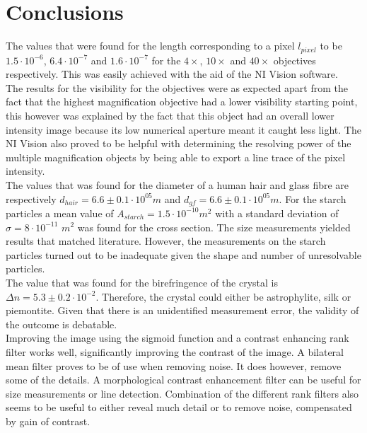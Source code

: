 \section{Conclusions}

The values that were found  for the length corresponding to a pixel $l_{pixel}$ to be $1.5\cdot10^{-6}$, $6.4\cdot10^{-7}$ and $1.6\cdot10^{-7}$ for the $4\times$, $10\times$ and $40\times$ objectives respectively. This was easily achieved with the aid of the NI Vision software.\\
The results for the visibility for the objectives were as expected apart from the fact that the highest magnification objective had a lower visibility starting point, this however was explained by the fact that this object had an overall lower intensity image because its low numerical aperture meant it caught less light. The NI Vision also proved to be helpful with determining the resolving power of the multiple magnification objects by being able to export a line trace of the pixel intensity.\\
The values that was found for the diameter of a human hair and glass fibre are respectively $d_{hair}=6.6\pm0.1\cdot10^{05} m$ and $d_{gf}=6.6\pm0.1\cdot10^{05} m$. For the starch particles a mean  value of $A_{starch}=1.5\cdot10^{-10} m^2$ with a standard deviation of $\sigma = 8 \cdot10^{-11}$ $m^2$ was found for the cross section. The size measurements yielded results that matched literature. However, the measurements on the starch particles turned out to be inadequate given the shape and number of unresolvable particles.\\
The value that was found for the birefringence of the crystal is $\Delta n = 5.3\pm0.2\cdot10^{-2}$. Therefore, the crystal could either be astrophylite, silk or piemontite. Given that there is an unidentified measurement error, the validity of the outcome is debatable.\\
Improving the image using the sigmoid function and a contrast enhancing rank filter works well, significantly improving the contrast of the image. A bilateral mean filter proves to be of use when removing noise. It does however, remove some of the details. A morphological contrast enhancement filter can be useful for size measurements or line detection. Combination of the different rank filters also seems to be useful to either reveal much detail or to remove noise, compensated by gain of contrast.  \\


